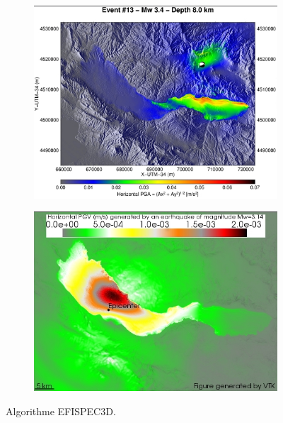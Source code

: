 \begin{figure}[!ht]
  \centering
  \begin{subfigure}{.4\textwidth}
    \includegraphics[width=\textwidth]{img/efispec1.png}
  \end{subfigure}
  \begin{subfigure}{.4\textwidth}
    \includegraphics[width=\textwidth]{img/efispec2.png}
  \end{subfigure}
  \caption{Algorithme EFISPEC3D.}
\end{figure}
